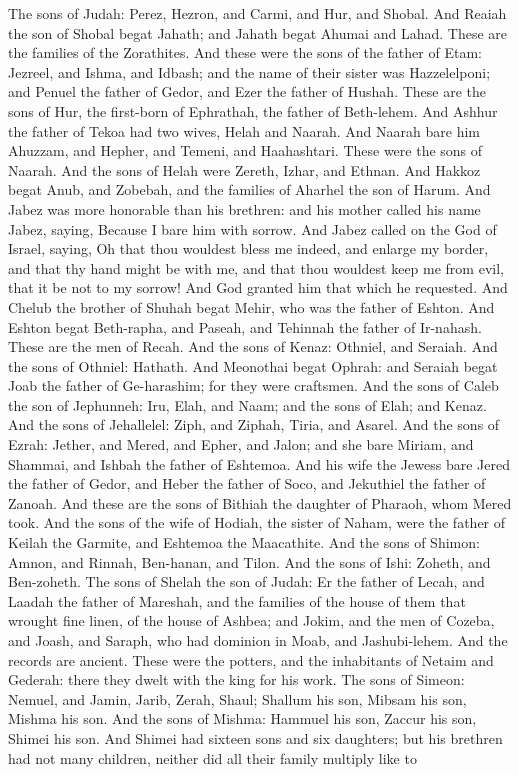 The sons of Judah: Perez, Hezron, and Carmi, and Hur, and Shobal. And Reaiah the son of Shobal begat Jahath; and Jahath begat Ahumai and Lahad. These are the families of the Zorathites. And these were the sons of the father of Etam: Jezreel, and Ishma, and Idbash; and the name of their sister was Hazzelelponi; and Penuel the father of Gedor, and Ezer the father of Hushah. These are the sons of Hur, the first-born of Ephrathah, the father of Beth-lehem. And Ashhur the father of Tekoa had two wives, Helah and Naarah. And Naarah bare him Ahuzzam, and Hepher, and Temeni, and Haahashtari. These were the sons of Naarah. And the sons of Helah were Zereth, Izhar, and Ethnan. And Hakkoz begat Anub, and Zobebah, and the families of Aharhel the son of Harum. And Jabez was more honorable than his brethren: and his mother called his name Jabez, saying, Because I bare him with sorrow. And Jabez called on the God of Israel, saying, Oh that thou wouldest bless me indeed, and enlarge my border, and that thy hand might be with me, and that thou wouldest keep me from evil, that it be not to my sorrow! And God granted him that which he requested. And Chelub the brother of Shuhah begat Mehir, who was the father of Eshton. And Eshton begat Beth-rapha, and Paseah, and Tehinnah the father of Ir-nahash. These are the men of Recah. And the sons of Kenaz: Othniel, and Seraiah. And the sons of Othniel: Hathath. And Meonothai begat Ophrah: and Seraiah begat Joab the father of Ge-harashim; for they were craftsmen. And the sons of Caleb the son of Jephunneh: Iru, Elah, and Naam; and the sons of Elah; and Kenaz. And the sons of Jehallelel: Ziph, and Ziphah, Tiria, and Asarel. And the sons of Ezrah: Jether, and Mered, and Epher, and Jalon; and she bare Miriam, and Shammai, and Ishbah the father of Eshtemoa. And his wife the Jewess bare Jered the father of Gedor, and Heber the father of Soco, and Jekuthiel the father of Zanoah. And these are the sons of Bithiah the daughter of Pharaoh, whom Mered took. And the sons of the wife of Hodiah, the sister of Naham, were the father of Keilah the Garmite, and Eshtemoa the Maacathite. And the sons of Shimon: Amnon, and Rinnah, Ben-hanan, and Tilon. And the sons of Ishi: Zoheth, and Ben-zoheth. The sons of Shelah the son of Judah: Er the father of Lecah, and Laadah the father of Mareshah, and the families of the house of them that wrought fine linen, of the house of Ashbea; and Jokim, and the men of Cozeba, and Joash, and Saraph, who had dominion in Moab, and Jashubi-lehem. And the records are ancient. These were the potters, and the inhabitants of Netaim and Gederah: there they dwelt with the king for his work.  The sons of Simeon: Nemuel, and Jamin, Jarib, Zerah, Shaul; Shallum his son, Mibsam his son, Mishma his son. And the sons of Mishma: Hammuel his son, Zaccur his son, Shimei his son. And Shimei had sixteen sons and six daughters; but his brethren had not many children, neither did all their family multiply like to 